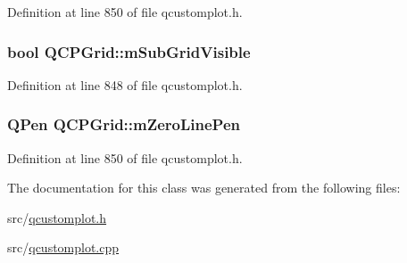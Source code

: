 Definition at line 850 of file qcustomplot.\-h.

\hypertarget{class_q_c_p_grid_a4e4a0400d6319bb44c06341f6298c87b}{
\subsubsection[{m\-Sub\-Grid\-Visible}]{\setlength{\rightskip}{0pt plus 5cm}bool Q\-C\-P\-Grid\-::m\-Sub\-Grid\-Visible\hspace{0.3cm}{\ttfamily [protected]}}}\label{class_q_c_p_grid_a4e4a0400d6319bb44c06341f6298c87b}


Definition at line 848 of file qcustomplot.\-h.

\hypertarget{class_q_c_p_grid_a379481871f17655c27eda30af233554f}{
\subsubsection[{m\-Zero\-Line\-Pen}]{\setlength{\rightskip}{0pt plus 5cm}Q\-Pen Q\-C\-P\-Grid\-::m\-Zero\-Line\-Pen\hspace{0.3cm}{\ttfamily [protected]}}}\label{class_q_c_p_grid_a379481871f17655c27eda30af233554f}


Definition at line 850 of file qcustomplot.\-h.



The documentation for this class was generated from the following files\-:\begin{DoxyCompactItemize}
\item 
src/\hyperlink{qcustomplot_8h}{qcustomplot.\-h}\item 
src/\hyperlink{qcustomplot_8cpp}{qcustomplot.\-cpp}\end{DoxyCompactItemize}
